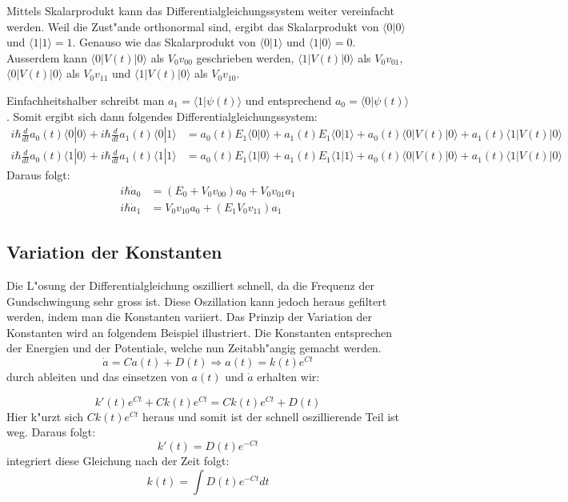 \begin{refsection}
Mittels Skalarprodukt kann das Differentialgleichungssystem weiter
vereinfacht werden.
Weil die Zust"ande orthonormal sind, ergibt das Skalarprodukt von $\langle0|0\rangle$
und $\langle1|1\rangle = 1$.
Genauso wie das Skalarprodukt von $\langle0|1\rangle$ und
$\langle1|0\rangle = 0$.
Ausserdem kann  $\langle0|V(t)|0\rangle$ als $V_{0}v_{00}$ geschrieben
werden, $\langle1|V(t)|0\rangle$ als $V_{0}v_{01}$,$\langle0|V(t)|0\rangle$
als $V_{0}v_{11}$ und $\langle1|V(t)|0\rangle$ als $V_{0}v_{10}$.

Einfachheitshalber schreibt man $a_1 = \langle1|\psi(t)\rangle$ und
entsprechend $a_0 = \langle0|\psi(t)\rangle$.
Somit ergibt sich dann folgendes Differentialgleichungssystem:
\begin{align*}
i\hbar\frac{d}{dt}a_{0}(t)\langle0|0\rangle +i\hbar\frac{d}{dt}a_{1}(t)\langle0|1\rangle&= a_{0}(t)E_{1}\langle0|0\rangle + a_{1}(t)E_{1}\langle0|1\rangle + a_{0}(t)\langle0|V(t)|0\rangle+ a_{1}(t)\langle1|V(t)|0\rangle
\\
i\hbar\frac{d}{dt}a_{0}(t)\langle1|0\rangle +i\hbar\frac{d}{dt}a_{1}(t)\langle1|1\rangle&= a_{0}(t)E_{1}\langle1|0\rangle + a_{1}(t)E_{1}\langle1|1\rangle + a_{0}(t)\langle0|V(t)|0\rangle+ a_{1}(t)\langle1|V(t)|0\rangle
\end{align*}
Daraus folgt:
\begin{align}
i\hbar\dot{a}_0&= (E_{0} + V_{0} v_{00}) a_{0} + V_{0} v_{01} a_{1}
\\
i\hbar\dot{a}_1&= V_{0} v_{10} a_{0} + (E_{1} V_{0} v_{11}) a_{1}
\end{align}

\subsection{Variation der Konstanten}
Die L"osung der Differentialgleichung oszilliert schnell, da die
Frequenz der Gundschwingung sehr gross ist.
Diese Oszillation kann jedoch heraus gefiltert werden, indem man die
Konstanten variiert.
Das Prinzip der Variation der Konstanten wird an folgendem Beispiel
illustriert.
Die Konstanten entsprechen der Energien und der Potentiale, welche nun
Zeitabh"angig gemacht werden.
\[
\dot{a} = C a(t) + D(t) \Rightarrow a(t) = k(t) e^{C t}
\] 
durch ableiten und das einsetzen von $ a(t)$ und  $ \dot{a} $ erhalten wir:

\[
k'(t) e^{C t} + C k(t) e^{C t} = C k(t) e^{C t} + D(t)
\] 
Hier k"urzt sich $ C k(t) e^{C t} $ heraus und somit ist der schnell
oszillierende Teil ist weg.
Daraus folgt:
\[
k'(t) = D(t) e^{-C t}
\] 
integriert diese Gleichung nach der Zeit folgt:
\[
k(t) = \int D(t) e^{-C t} dt 
\]


\end{refsection}
